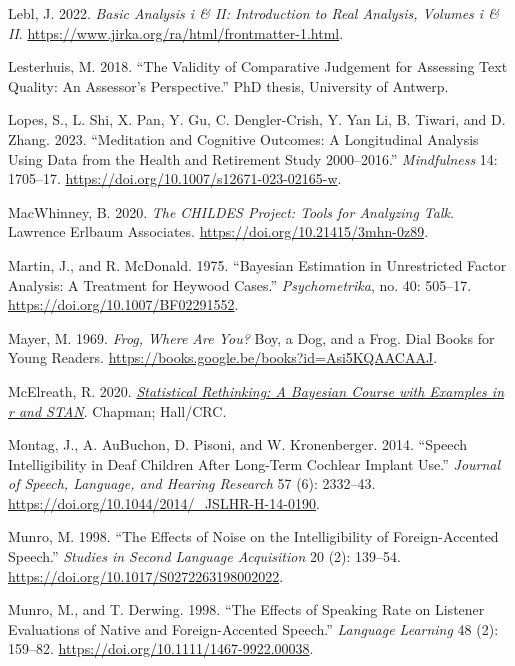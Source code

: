 \documentclass[
sn-apacite
]{sn-jnl}
\newlength{\cslhangindent}
\newenvironment{CSLReferences}[2] %
 {\begin{list}{}{%
  \setlength{\itemindent}{0pt}
  \setlength{\leftmargin}{0pt}
  \setlength{\parsep}{0pt}
  \ifodd #1
   \setlength{\leftmargin}{\cslhangindent}
   \setlength{\itemindent}{-1\cslhangindent}
  \fi
  \setlength{\itemsep}{#2\baselineskip}}}
 {\end{list}}
\begin{document}
\begin{CSLReferences}{1}{0}
Lebl, J. 2022. \emph{Basic Analysis i \& II: Introduction to Real
Analysis, Volumes i \& II}.
\url{https://www.jirka.org/ra/html/frontmatter-1.html}.

Lesterhuis, M. 2018. {``The Validity of Comparative Judgement for
Assessing Text Quality: An Assessor's Perspective.''} PhD thesis,
University of Antwerp.

Lopes, S., L. Shi, X. Pan, Y. Gu, C. Dengler-Crish, Y. Yan Li, B.
Tiwari, and D. Zhang. 2023. {``Meditation and Cognitive Outcomes: A
Longitudinal Analysis Using Data from the Health and Retirement Study
2000--2016.''} \emph{Mindfulness} 14: 1705--17.
\url{https://doi.org/10.1007/s12671-023-02165-w}.

MacWhinney, B. 2020. \emph{The CHILDES Project: Tools for Analyzing
Talk}. Lawrence Erlbaum Associates.
\url{https://doi.org/10.21415/3mhn-0z89}.

Martin, J., and R. McDonald. 1975. {``Bayesian Estimation in
Unrestricted Factor Analysis: A Treatment for Heywood Cases.''}
\emph{Psychometrika}, no. 40: 505--17.
\url{https://doi.org/10.1007/BF02291552}.

Mayer, M. 1969. \emph{Frog, Where Are You?} Boy, a Dog, and a Frog. Dial
Books for Young Readers.
\url{https://books.google.be/books?id=Asi5KQAACAAJ}.

McElreath, R. 2020. \emph{\href{}{Statistical Rethinking: A Bayesian
Course with Examples in r and STAN}}. Chapman; Hall/CRC.

Montag, J., A. AuBuchon, D. Pisoni, and W. Kronenberger. 2014. {``Speech
Intelligibility in Deaf Children After Long-Term Cochlear Implant
Use.''} \emph{Journal of Speech, Language, and Hearing Research} 57 (6):
2332--43. \url{https://doi.org/10.1044/2014/_JSLHR-H-14-0190}.

Munro, M. 1998. {``The Effects of Noise on the Intelligibility of
Foreign-Accented Speech.''} \emph{Studies in Second Language
Acquisition} 20 (2): 139--54.
\url{https://doi.org/10.1017/S0272263198002022}.

Munro, M., and T. Derwing. 1998. {``The Effects of Speaking Rate on
Listener Evaluations of Native and Foreign-Accented Speech.''}
\emph{Language Learning} 48 (2): 159--82.
\url{https://doi.org/10.1111/1467-9922.00038}.


\end{CSLReferences}
\end{document}
